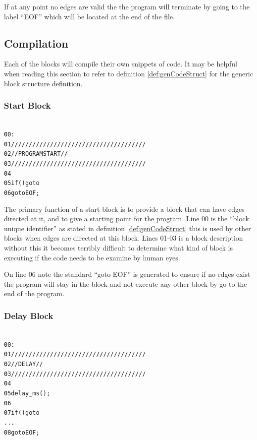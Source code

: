 If at any point no edges are valid the the program will terminate by going to the label ``EOF'' which will be located at the end of the file.


\subsection{Compilation}
Each of the blocks will compile their own snippets of code. It may be helpful when reading this section to refer to definition \ref{def:genCodeStruct} for the generic block structure definition.

\subsubsection{Start Block}
\begin{alltt}
\label{def:cmpstartblock}
00 :
01 //////////////////////////////////////
02 //        PROGRAM START             //
03 //////////////////////////////////////
04 
05 if () goto 
06 goto EOF;
\end{alltt}

The primary function of a start block is to provide a block that can have edges directed at it, and to give a starting point for the program. Line 00 is the ``block unique identifier'' as stated in definition \ref{def:genCodeStruct} this is used by other blocks when edges are directed at this block. Lines 01-03 is a block description without this it becomes terribly difficult to determine what kind of block is executing if the code needs to be examine by human eyes. 

On line 06 note the standard ``goto EOF'' is generated to ensure if no edges exist the program will stay in the block and not execute any other block by go to the end of the program.

\subsubsection{Delay Block}
\begin{alltt}
\label{def:cmpdelayblock}
00 :
01 //////////////////////////////////////
02 //        DELAY                     //
03 //////////////////////////////////////
04
05 delay_ms();
06 
07 if () goto 
...
08 goto EOF;
\end{alltt}

